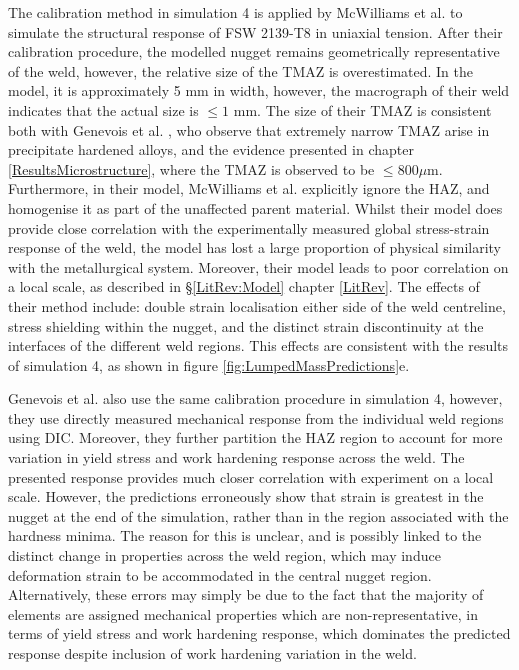 The calibration method in simulation 4 is applied by McWilliams et al. \cite{McWilliams2013} to simulate the structural response of FSW 2139-T8 in uniaxial tension. After their calibration procedure, the modelled nugget remains geometrically representative of the weld, however, the relative size of the TMAZ is overestimated. In the model, it is approximately 5 mm in width, however, the macrograph of their weld indicates that the actual size is $\leq 1$ mm. The size of their TMAZ is consistent both with Genevois et al. \cite{Genevois2005}, who observe that extremely narrow TMAZ arise in precipitate hardened alloys, and the evidence presented in chapter \ref{ResultsMicrostructure}, where the TMAZ is observed to be $\leq 800 \mu$m. Furthermore, in their model, McWilliams et al. explicitly ignore the HAZ, and homogenise it as part of the unaffected parent material. Whilst their model does provide close correlation with the experimentally measured global stress-strain response of the weld, the model has lost a large proportion of physical similarity with the metallurgical system. Moreover, their model leads to poor correlation on a local scale, as described in \S\ref{LitRev:Model} chapter \ref{LitRev}. The effects of their method include: double strain localisation either side of the weld centreline, stress shielding within the nugget, and the distinct strain discontinuity at the interfaces of the different weld regions. This effects are consistent with the results of simulation 4, as shown in figure \ref{fig:LumpedMassPredictions}e.

Genevois et al. \cite{Genevois2006} also use the same calibration procedure in simulation 4, however, they use directly measured mechanical response from the individual weld regions using DIC. Moreover, they further partition the HAZ region to account for more variation in yield stress and work hardening response across the weld. The presented response provides much closer correlation with experiment on a local scale. However, the predictions erroneously show that strain is greatest in the nugget at the end of the simulation, rather than in the region associated with the hardness minima. The reason for this is unclear, and is possibly linked to the distinct change in properties across the weld region, which may induce deformation strain to be accommodated in the central nugget region. Alternatively, these errors may simply be due to the fact that the majority of elements are assigned mechanical properties which are non-representative, in terms of yield stress and work hardening response, which dominates the predicted response despite inclusion of work hardening variation in the weld.

